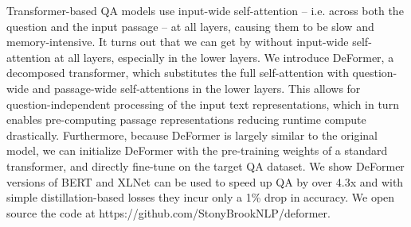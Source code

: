 Transformer-based QA models use input-wide self-attention -- i.e. across both the question and the input passage -- at all layers, causing them to be slow and memory-intensive. It turns out that we can get by without input-wide self-attention at all layers, especially in the lower layers. We introduce DeFormer, a decomposed transformer, which substitutes the full self-attention with question-wide and passage-wide self-attentions in the lower layers. This allows for question-independent processing of the input text representations, which in turn enables pre-computing passage representations reducing runtime compute drastically. Furthermore, because DeFormer is largely similar to the original model, we can initialize DeFormer with the pre-training weights of a standard transformer, and directly fine-tune on the target QA dataset. We show DeFormer versions of BERT and XLNet can be used to speed up QA by over 4.3x and with simple distillation-based losses they incur only a 1\% drop in accuracy. We open source the code at https://github.com/StonyBrookNLP/deformer.
